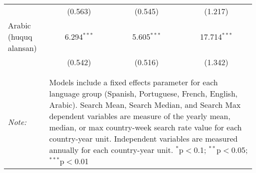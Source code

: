 \begin{table}[!htbp]
\begin{tabular}{@{\extracolsep{5pt}}lccc}
  & (0.563) & (0.545) & (1.217) \\ 
  Arabic (huquq alansan) & 6.294$^{***}$ & 5.605$^{***}$ & 17.714$^{***}$ \\ 
  & (0.542) & (0.516) & (1.342) \\ 
 \hline \\[-1.8ex] 
\hline 
\hline \\[-1.8ex] 
\textit{Note:}  & \multicolumn{3}{l}{\parbox[t]{8cm}{Models include a fixed effects parameter for each language group (Spanish, Portuguese, French, English, Arabic). Search Mean, Search Median, and Search Max dependent variables are measure of the yearly mean, median, or max country-week search rate value for each country-year unit. Independent variables are measured annually for each country-year unit. $^{*}$p$<$0.1; $^{**}$p$<$0.05; $^{***}$p$<$0.01}} \\ 
\end{tabular} 
\end{table} 

